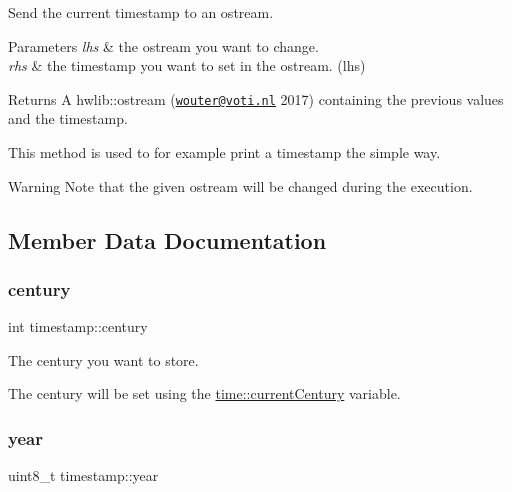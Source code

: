 Send the current timestamp to an ostream. 


\begin{DoxyParams}{Parameters}
{\em lhs} & the ostream you want to change. \\
\hline
{\em rhs} & the timestamp you want to set in the ostream. (lhs) \\
\hline
\end{DoxyParams}
\begin{DoxyReturn}{Returns}
A hwlib\+::ostream (\href{mailto:wouter@voti.nl}{\tt wouter@voti.\+nl} 2017) containing the previous values and the timestamp.
\end{DoxyReturn}
This method is used to for example print a timestamp the simple way. \begin{DoxyWarning}{Warning}
Note that the given ostream will be changed during the execution. 
\end{DoxyWarning}


\subsection{Member Data Documentation}
\mbox{\label{classtimestamp_afe83888ffa38c1615a3d12b012f235b3}} 
\subsubsection{\texorpdfstring{century}{century}}
{\footnotesize\ttfamily int timestamp\+::century\hspace{0.3cm}{\ttfamily [protected]}}



The century you want to store. 

The century will be set using the \mbox{\hyperlink{classtime_acab6780ebb25862cb83316cb967b8b57}{time\+::current\+Century}} variable. \mbox{\label{classtimestamp_a6df342bdd1101cf67f9a4831d5372d58}} 
\subsubsection{\texorpdfstring{year}{year}}
{\footnotesize\ttfamily uint8\+\_\+t timestamp\+::year\hspace{0.3cm}{\ttfamily [protected]}}




